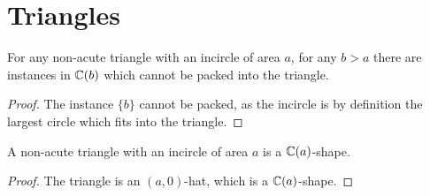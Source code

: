 \documentclass[%
    a4paper,              %
    style=screen,          %
    bibliography=totoc,   %
    nexus,                %
    lnum,                 %
    extramargin,          %
]{tubsbook}
\begin{document}
\section{Triangles}

\begin{theorem}
    For any non-acute triangle with an incircle of area $a$, for any $b > a$ there are instances in $\mathbb{C}(b)$ which cannot be packed into the triangle.
\end{theorem}

\begin{proof}
    The instance $\{b\}$ cannot be packed, as the incircle is by definition the largest circle which fits into the triangle.
\end{proof}

\begin{theorem}
    A non-acute triangle with an incircle of area $a$ is a $\mathbb{C}(a)$-shape.
\end{theorem}

\begin{proof}
    The triangle is an $(a,0)$-hat, which is a $\mathbb{C}(a)$-shape.
\end{proof}

%
%
%
%
%
%
%
%
\end{document}
